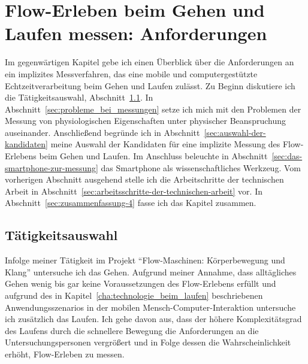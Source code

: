 \chapter{Flow-Erleben beim Gehen und Laufen messen: Anforderungen}
\label{cha:flow_erleben_beim_gehen_und_laufen_messen_anforderungen}
Im gegenwärtigen Kapitel gebe ich einen Überblick über die Anforderungen an ein implizites Messverfahren, das eine mobile und computergestützte Echtzeitverarbeitung beim Gehen und Laufen zulässt. Zu Beginn diskutiere ich die Tätigkeitsauswahl, Abschnitt~\ref{sec:taetigkeitsauswahl}. In Abschnitt~\ref{sec:probleme_bei_messungen} setze ich mich mit den Problemen der Messung von physiologischen Eigenschaften unter physischer Beanspruchung auseinander. Anschließend begründe ich in Abschnitt~\ref{sec:auswahl-der-kandidaten} meine Auswahl der Kandidaten für eine implizite Messung des Flow-Erlebens beim Gehen und Laufen. Im Anschluss beleuchte in Abschnitt~\ref{sec:das-smartphone-zur-messung} das Smartphone als wissenschaftliches Werkzeug. Vom vorherigen Abschnitt ausgehend stelle ich die Arbeitschritte der technischen Arbeit in Abschnitt~\ref{sec:arbeitsschritte-der-technischen-arbeit} vor. In Abschnitt~\ref{sec:zusammenfassung-4} fasse ich das Kapitel zusammen.

\section{Tätigkeitsauswahl}
\label{sec:taetigkeitsauswahl}
Infolge meiner Tätigkeit im Projekt "`Flow-Maschinen: Körperbewegung und Klang"' untersuche ich das Gehen. Aufgrund meiner Annahme, dass alltägliches Gehen wenig bis gar keine Voraussetzungen des Flow-Erlebens erfüllt und aufgrund des in Kapitel~\ref{cha:technologie_beim_laufen} beschriebenen Anwendungsszenarios in der mobilen Mensch-Computer-Interaktion untersuche ich zusätzlich das Laufen. Ich gehe davon aus, dass der höhere Komplexitätsgrad des Laufens durch die schnellere Bewegung die Anforderungen an die Untersuchungspersonen vergrößert und in Folge dessen die Wahrscheinlichkeit erhöht, Flow-Erleben zu messen.

